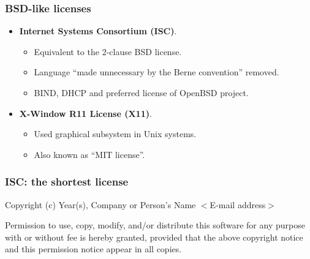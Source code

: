 
\begin{frame}
\frametitle{BSD-like licenses}

\begin{itemize}

\item {\bf Internet Systems Consortium (ISC)}. 
	\begin{itemize}
	\item Equivalent to the 2-clause BSD license.
	\item Language ``made unnecessary by the Berne convention'' removed.
	\item BIND, DHCP and preferred license of OpenBSD project.
	\end{itemize}
\item {\bf X-Window R11 License (X11)}. 
	\begin{itemize}
	\item Used graphical subsystem in Unix systems. 
	\item Also known as ``MIT license''. 
	\end{itemize}
\end{itemize}

\end{frame}


\begin{frame}
\frametitle{ISC: the shortest license}

{\small Copyright (c) Year(s), Company or Person's Name $<$E-mail address$>$} \\

\medskip

\alert{Permission} to \alert{use}, \alert{copy}, \alert{modify}, and/or \alert{distribute} this software for any
purpose with or without fee is hereby granted, provided that the above
copyright notice and this permission notice appear in all copies.

\end{frame}



